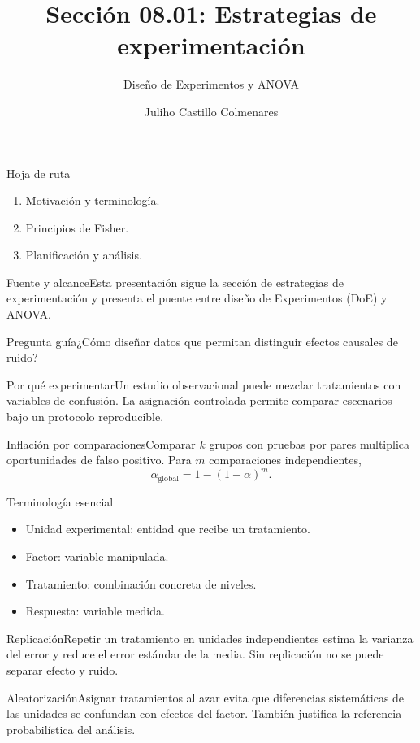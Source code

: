 \documentclass[10pt,aspectratio=169]{beamer}
\title[Estrategias de experimentación]{Sección 08.01: Estrategias de experimentación}\subtitle{Diseño de Experimentos y ANOVA}
\author[J. Castillo Colmenares]{Juliho Castillo Colmenares}\institute{Tecnológico de Monterrey}\date{}
\begin{document}
\begin{frame}[plain]\titlepage\end{frame}
\begin{frame}{Hoja de ruta}\small\begin{enumerate}\item Motivación y terminología.\item Principios de Fisher.\item Planificación y análisis.\end{enumerate}\end{frame}
\begin{frame}{Fuente y alcance}\small Esta presentación sigue la sección de estrategias de experimentación y presenta el puente entre diseño de Experimentos (DoE) y ANOVA.\begin{block}{Pregunta guía}¿Cómo diseñar datos que permitan distinguir efectos causales de ruido?\end{block}\end{frame}
\begin{frame}{Por qué experimentar}\small Un estudio observacional puede mezclar tratamientos con variables de confusión. La asignación controlada permite comparar escenarios bajo un protocolo reproducible.\end{frame}
\begin{frame}{Inflación por comparaciones}\small Comparar $k$ grupos con pruebas por pares multiplica oportunidades de falso positivo. Para $m$ comparaciones independientes,\[\alpha_{\mathrm{global}}=1-(1-\alpha)^m.\]\end{frame}
\begin{frame}{Terminología esencial}\small\begin{itemize}\item Unidad experimental: entidad que recibe un tratamiento.\item Factor: variable manipulada.\item Tratamiento: combinación concreta de niveles.\item Respuesta: variable medida.\end{itemize}\end{frame}
\begin{frame}{Replicación}\small Repetir un tratamiento en unidades independientes estima la varianza del error y reduce el error estándar de la media. Sin replicación no se puede separar efecto y ruido.\end{frame}
\begin{frame}{Aleatorización}\small Asignar tratamientos al azar evita que diferencias sistemáticas de las unidades se confundan con efectos del factor. También justifica la referencia probabilística del análisis.\end{frame}
\end{document}
